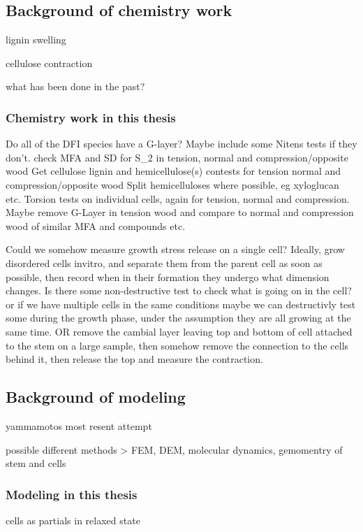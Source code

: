 \documentclass{article}
\begin{document}
\subsection{Background of chemistry work}

lignin swelling

cellulose contraction

what has been done in the past?


\subsubsection{Chemistry work in this thesis}

Do all of the DFI species have a G-layer?
Maybe include some Nitens tests if they don't.
check MFA and SD for S\_2 in tension, normal and compression/opposite wood
Get cellulose lignin and hemicellulose(s) contests for tension normal and
compression/opposite wood Split hemicelluloses where possible, eg xyloglucan
etc.
Torsion tests on individual cells, again for tension, normal and compression. Maybe remove G-Layer
in tension wood and compare to normal and compression wood of similar MFA and compounds etc.

Could we somehow measure growth stress release on a single cell?
Ideally, grow disordered cells invitro, and separate them from the parent cell
as soon as possible, then record when in their formation they undergo what
dimension changes. Is there some non-destructive test to check what is going on in the cell? or if we have multiple cells in the same conditions maybe we can destructivly test some during the growth phase, under the assumption they are all growing at the same time.
OR
remove the cambial layer leaving top and bottom of cell attached to the stem on a large sample,
then somehow remove the connection to the cells behind it, then release the top and measure the contraction.


\subsection{Background of modeling}

yammamotos most resent attempt

possible different methods > FEM, DEM, molecular dynamics, gemomentry of stem
and cells

\subsubsection{Modeling in this thesis}
cells as partials in relaxed state
\end{document}
